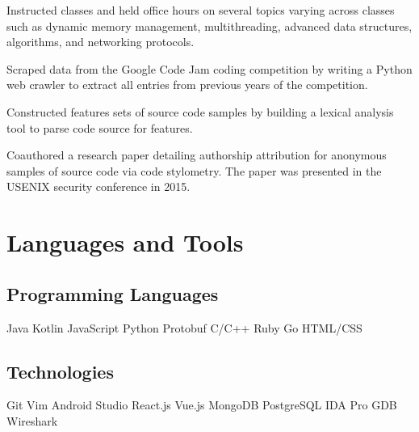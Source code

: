 \documentclass[]{template}
\begin{document}
\begin{tightemize}
\item Instructed classes and held office hours on several topics varying across classes such as dynamic memory management, multithreading, advanced data structures, algorithms, and networking protocols.
\end{tightemize}
\sectionsep

\begin{tightemize}
\item Scraped data from the Google Code Jam coding competition by writing a Python web crawler to extract all entries from previous years of the competition.
\item Constructed features sets of source code samples by building a lexical analysis tool to parse code source for features.
\item Coauthored a research paper detailing authorship attribution for anonymous samples of source code via code stylometry. The paper was presented in the USENIX security conference in 2015.
\end{tightemize}
\sectionsep

\section{Languages and Tools}
\begin{minipage}[t]{.45\textwidth}
\subsection{Programming Languages}
Java
\textbullet{} Kotlin
\textbullet{} JavaScript
\textbullet{} Python
\textbullet{} Protobuf
\textbullet{} C/C++
\textbullet{} Ruby
\textbullet{} Go
\textbullet{} HTML/CSS
\sectionsep
\end{minipage}
\hfill
\begin{minipage}[t]{.45\textwidth}
\subsection{Technologies}
Git
\textbullet{} Vim
\textbullet{} Android Studio
\textbullet{} React.js
\textbullet{} Vue.js
\textbullet{} MongoDB
\textbullet{} PostgreSQL
\textbullet{} IDA  Pro
\textbullet{} GDB
\textbullet{} Wireshark
\end{minipage}
\end{document}
